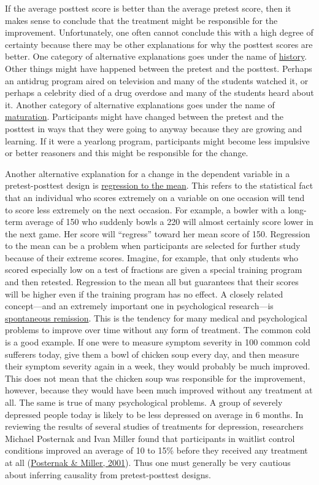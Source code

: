 \documentclass[
]{krantz}
\begin{document}
If the average posttest score is better than the average pretest score, then it makes sense to conclude that the treatment might be responsible for the improvement. Unfortunately, one often cannot conclude this with a high degree of certainty because there may be other explanations for why the posttest scores are better. One category of alternative explanations goes under the name of \protect\hyperlink{history}{history}. Other things might have happened between the pretest and the posttest. Perhaps an antidrug program aired on television and many of the students watched it, or perhaps a celebrity died of a drug overdose and many of the students heard about it. Another category of alternative explanations goes under the name of \protect\hyperlink{maturation}{maturation}. Participants might have changed between the pretest and the posttest in ways that they were going to anyway because they are growing and learning. If it were a yearlong program, participants might become less impulsive or better reasoners and this might be responsible for the change.

Another alternative explanation for a change in the dependent variable in a pretest-posttest design is \protect\hyperlink{regression-to-the-mean}{regression to the mean}. This refers to the statistical fact that an individual who scores extremely on a variable on one occasion will tend to score less extremely on the next occasion. For example, a bowler with a long-term average of 150 who suddenly bowls a 220 will almost certainly score lower in the next game. Her score will ``regress'' toward her mean score of 150. Regression to the mean can be a problem when participants are selected for further study because of their extreme scores. Imagine, for example, that only students who scored especially low on a test of fractions are given a special training program and then retested. Regression to the mean all but guarantees that their scores will be higher even if the training program has no effect. A closely related concept---and an extremely important one in psychological research---is \protect\hyperlink{spontaneous-remission}{spontaneous remission}. This is the tendency for many medical and psychological problems to improve over time without any form of treatment. The common cold is a good example. If one were to measure symptom severity in 100 common cold sufferers today, give them a bowl of chicken soup every day, and then measure their symptom severity again in a week, they would probably be much improved. This does not mean that the chicken soup was responsible for the improvement, however, because they would have been much improved without any treatment at all. The same is true of many psychological problems. A group of severely depressed people today is likely to be less depressed on average in 6 months. In reviewing the results of several studies of treatments for depression, researchers Michael Posternak and Ivan Miller found that participants in waitlist control conditions improved an average of 10 to 15\% before they received any treatment at all (\protect\hyperlink{ref-posternak2001untreated}{Posternak \& Miller, 2001}). Thus one must generally be very cautious about inferring causality from pretest-posttest designs.
\end{document}
